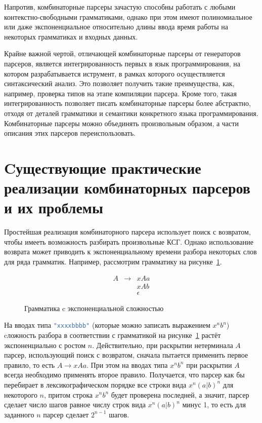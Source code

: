 \documentclass[times]{itmo-student-thesis}
\begin{document}
Напротив, комбинаторные парсеры зачастую способны работать с любыми контекстно-свободными грамматиками, однако при этом
имеют полиномиальное или даже экспоненциальное относительно длины ввода время работы на некоторых грамматиках и входных
данных.

Крайне важной чертой, отличающей  комбинаторные парсеры от генераторов парсеров, является интегрированность первых в
язык программирования, на котором разрабатывается иструмент, в рамках которого осуществляется синтаксический анализ.
Это  позволяет	получить  такие преимущества, как, например, проверка типов на этапе компиляции парсера. Кроме того,
такая интегрированность позволяет писать комбинаторные парсеры более абстрактно, отходя от деталей грамматики и
семантики конкретного языка программирования. Комбинаторные парсеры можно объединять произвольным образом, а части
описания этих парсеров переиспользовать.

\section{Cуществующие практические реализации комбинаторных парсеров и их проблемы}\label{sec:current_parser_combinators_problems}

Простейшая реализация комбинаторного парсера использует поиск с возвратом, чтобы имееть возможность разбирать
произвольные  КСГ. Однако использование возврата может приводить к экспоненциальному времени разбора некоторых слов
для ряда грамматик. Например, рассмотрим грамматику на рисунке~\ref{exp_grammar}.

\begin{figure}[!h]
\caption{Грамматика c экспоненциальной сложностью}\label{exp_grammar}
\[
    \begin{array}{lll}
        A & \to & xAa      \\
          &     & xAb      \\
          &     & \epsilon
    \end{array}
\]
\end{figure}

На вводах типа \lstinline[language=Haskell]{"xxxxbbbb"} (которые можно записать выражением $x^nb^n$) cложность разбора
в соответствии с грамматикой на рисунке~\ref{exp_grammar} растёт экспоненциально с ростом $n$.
Действительно, при раскрытии нетерминала $A$ парсер, использующий поиск с возвратом, сначала пытается применить первое
правило, то есть $A \to xAa$. При этом на вводах типа $x^nb^n$ при раскрытии
$A$ всегда необходимо применять второе правило. Получается, что парсер как бы перебирает в
лексикографическом порядке все строки вида $x^n(a|b)^n$ для некоторого $n$, притом строка
$x^nb^n$ будет проверена последней, а значит, парсер сделает число шагов равное числу строк вида
$x^n(a|b)^n$ минус 1, то есть для заданного $n$ парсер сделает $2^{n-1}$ шагов.
\end{document}

